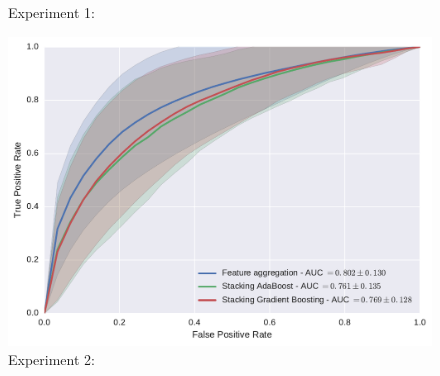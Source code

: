 \begin{figure}
  \hfill
  \hspace*{\fill}
  \caption{Experiment 1:}
  \label{fig:}
\end{figure}

\begin{figure}
  \centering
  \includegraphics[width=0.7\linewidth]{6_pipeline/figures/exp-2/comb_all.pdf}
  \caption{Experiment 2:}
  \label{fig:}
\end{figure}

